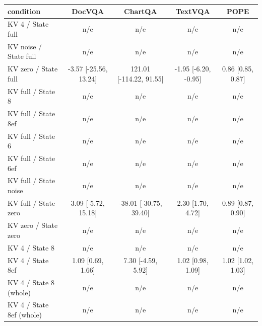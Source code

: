 \begin{tabular}{lcccc}
\toprule
condition & DocVQA & ChartQA & TextVQA & POPE \\
\midrule
KV 4 / State full & n/e & n/e & n/e & n/e \\
KV noise / State full & n/e & n/e & n/e & n/e \\
KV zero / State full & -3.57 {\scriptsize[-25.56, 13.24]} & 121.01 {\scriptsize[-114.22, 91.55]} & -1.95 {\scriptsize[-6.20, -0.95]} & 0.86 {\scriptsize[0.85, 0.87]} \\
KV full / State 8 & n/e & n/e & n/e & n/e \\
KV full / State 8ef & n/e & n/e & n/e & n/e \\
KV full / State 6 & n/e & n/e & n/e & n/e \\
KV full / State 6ef & n/e & n/e & n/e & n/e \\
KV full / State noise & n/e & n/e & n/e & n/e \\
KV full / State zero & 3.09 {\scriptsize[-5.72, 15.18]} & -38.01 {\scriptsize[-30.75, 39.40]} & 2.30 {\scriptsize[1.70, 4.72]} & 0.89 {\scriptsize[0.87, 0.90]} \\
KV zero / State zero & n/e & n/e & n/e & n/e \\
KV 4 / State 8 & n/e & n/e & n/e & n/e \\
KV 4 / State 8ef & 1.09 {\scriptsize[0.69, 1.66]} & 7.30 {\scriptsize[-4.59, 5.92]} & 1.02 {\scriptsize[0.98, 1.09]} & 1.02 {\scriptsize[1.02, 1.03]} \\
KV 4 / State 8 (whole) & n/e & n/e & n/e & n/e \\
KV 4 / State 8ef (whole) & n/e & n/e & n/e & n/e \\
\bottomrule
\end{tabular}
